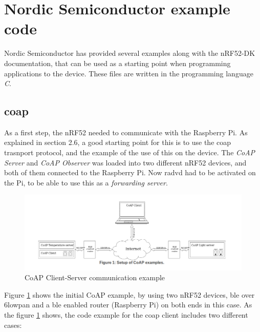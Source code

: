 



\section{Nordic Semiconductor example code}

Nordic Semiconductor has provided several examples along with the nRF52-DK documentation, that can be used as a starting point when programming applications to the device. These files are written in the programming language \textit{C}. 

\subsection{\gls{coap}}

As a first step, the nRF52 needed to communicate with the Raspberry Pi. As explained in section 2.6, a good starting point for this is to use the \gls{coap} trasnport protocol, and the example of the use of this on the device. The \textit{CoAP Server} and \textit{CoAP Observer} was loaded into two different nRF52 devices, and both of them connected to the Raspberry Pi. Now \gls{radvd} had to be activated on the Pi, to be able to use this as a \textit{forwarding server}. 

\begin{figure}[ht]
    \centering
    \includegraphics[scale=0.47]{CoAPExample.png}    
    \caption{CoAP Client-Server communication example}
    \label{fig:CoAPexample1}
\end{figure}

Figure \ref{fig:CoAPexample1} shows the initial CoAP example, by using two nRF52 devices, \gls{ble} over \gls{6lowpan} and a \gls{ble} enabled router (Raspberry Pi) on both ends in this case. As the figure \ref{fig:CoAPexample1} shows, the code example for the \gls{coap} client includes two different cases: 

